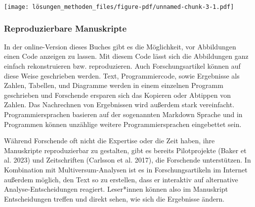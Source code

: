 \documentclass[
  letterpaper,
  DIV=11,
  numbers=noendperiod]{scrreprt}
\newenvironment{Shaded}{\begin{snugshade}}{\end{snugshade}}
\newcommand{\AttributeTok}[1]{\textcolor[rgb]{0.40,0.45,0.13}{#1}}
\newcommand{\CommentTok}[1]{\textcolor[rgb]{0.37,0.37,0.37}{#1}}
\newcommand{\DecValTok}[1]{\textcolor[rgb]{0.68,0.00,0.00}{#1}}
\newcommand{\FloatTok}[1]{\textcolor[rgb]{0.68,0.00,0.00}{#1}}
\newcommand{\FunctionTok}[1]{\textcolor[rgb]{0.28,0.35,0.67}{#1}}
\newcommand{\NormalTok}[1]{\textcolor[rgb]{0.00,0.23,0.31}{#1}}
\newcommand{\OtherTok}[1]{\textcolor[rgb]{0.00,0.23,0.31}{#1}}
\newcommand{\SpecialCharTok}[1]{\textcolor[rgb]{0.37,0.37,0.37}{#1}}
\newcommand{\StringTok}[1]{\textcolor[rgb]{0.13,0.47,0.30}{#1}}
\begin{document}
\begin{Shaded}
\end{Shaded}

\texttt{[image: lösungen\_methoden\_files/figure-pdf/unnamed-chunk-3-1.pdf]}

\subsubsection{Reproduzierbare
Manuskripte}\label{reproduzierbare-manuskripte}

In der online-Version dieses Buches gibt es die Möglichkeit, vor
Abbildungen einen Code anzeigen zu lassen. Mit diesem Code lässt sich
die Abbildungen ganz einfach rekonstruieren bzw. reproduzieren. Auch
Forschungsartikel können auf diese Weise geschrieben werden. Text,
Programmiercode, sowie Ergebnisse als Zahlen, Tabellen, und Diagramme
werden in einem einzelnen Programm geschrieben und Forschende ersparen
sich das Kopieren oder Abtippen von Zahlen. Das Nachrechnen von
Ergebnissen wird außerdem stark vereinfacht. Programmiersprachen
basieren auf der sogenannten Markdown Sprache und in Programmen können
unzählige weitere Programmiersprachen eingebettet sein.

Während Forschende oft nicht die Expertise oder die Zeit haben, ihre
Manuskripte reproduzierbar zu gestalten, gibt es bereits Pilotprojekte
(Baker et al. 2023) und Zeitschriften (Carlsson et al. 2017), die
Forschende unterstützen. In Kombination mit Multiversum-Analysen ist es
in Forschungsartikeln im Internet außerdem möglich, den Text so zu
erstellen, dass er interaktiv auf alternative Analyse-Entscheidungen
reagiert. Leser*innen können also im Manuskript Entscheidungen treffen
und direkt sehen, wie sich die Ergebnisse ändern.
\end{document}

